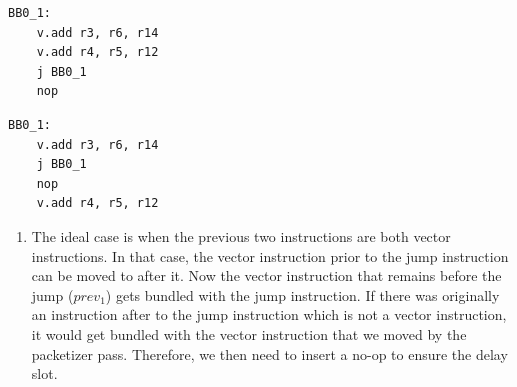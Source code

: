 

\label{lst:delayslot1}
\begin{center}
\hspace{2px}\begin{minipage}{.475\textwidth}
\begin{lstlisting}[frame=tlrb]
BB0_1:
    v.add r3, r6, r14
    v.add r4, r5, r12
    j BB0_1
    nop
\end{lstlisting}
\end{minipage}\hfill
\begin{minipage}{.475\textwidth}
\begin{lstlisting}[frame=tlrb]
BB0_1:
    v.add r3, r6, r14
    j BB0_1
    nop
    v.add r4, r5, r12
\end{lstlisting}
\end{minipage}
\end{center}

\begin{enumerate}
\item The ideal case is when the previous two instructions are both vector instructions. In that case, the vector instruction prior to the jump instruction can be moved to after it. Now the vector instruction that remains before the jump ($prev_1$) gets bundled with the jump instruction. If there was originally an instruction after to the jump instruction which is not a vector instruction, it would get bundled with the vector instruction that we moved by the packetizer pass. Therefore, we then need to insert a no-op to ensure the delay slot. %
\end{enumerate}

